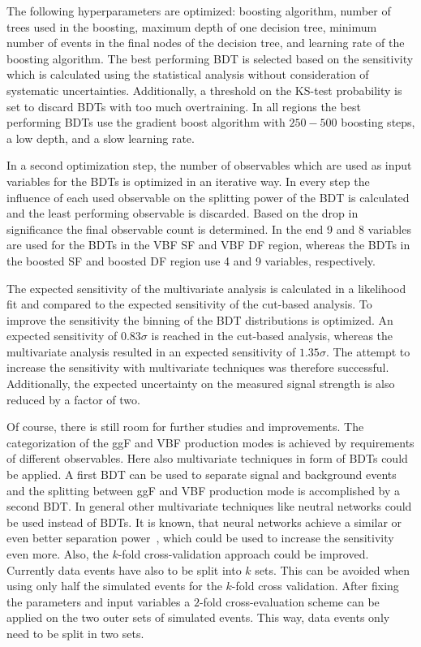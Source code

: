 The following hyperparameters are optimized: boosting algorithm, number of trees used in the boosting, maximum depth of one decision tree,
minimum number of events in the final nodes of the decision tree, and learning rate of the boosting algorithm.
The best performing BDT is selected based on the sensitivity which is calculated using the statistical analysis without consideration of systematic uncertainties.
Additionally, a threshold on the KS-test probability is set to discard BDTs with too much overtraining.
In all regions the best performing BDTs use the gradient boost algorithm with $250 - 500$ boosting steps, a low depth, and a slow learning rate.

In a second optimization step, the number of observables which are used as input variables for the BDTs is optimized in
an iterative way.
In every step the influence of each used observable on the splitting power of the BDT is calculated and the least performing observable is discarded.
Based on the drop in significance the final observable count is determined.
In the end 9 and 8 variables are used for the BDTs in the VBF SF and VBF DF region, whereas the BDTs in the boosted SF
and boosted DF region use 4 and 9 variables, respectively.

The expected sensitivity of the multivariate analysis is calculated in a likelihood fit and compared to the expected sensitivity of
the cut-based analysis.
To improve the sensitivity the binning of the BDT distributions is optimized.
An expected sensitivity of $0.83\sigma$ is reached in the cut-based analysis, whereas the multivariate analysis resulted in
an expected sensitivity of $1.35\sigma$.
The attempt to increase the sensitivity with multivariate techniques was therefore successful.
Additionally, the expected uncertainty on the measured signal strength is also reduced by a factor of two.

Of course, there is still room for further studies and improvements.
The categorization of the ggF and VBF production modes is achieved by requirements of different observables.
Here also multivariate techniques in form of BDTs could be applied.
A first BDT can be used to separate signal and background events and the splitting between ggF and VBF production
mode is accomplished by a second BDT\@.
In general other multivariate techniques like neutral networks could be used instead of BDTs.
It is known, that neural networks achieve a similar or even better separation power~\cite{TMVA}, which could be used to increase
the sensitivity even more.
Also, the $k$-fold cross-validation approach could be improved.
Currently data events have also to be split into $k$ sets.
This can be avoided when using only half the simulated events for the $k$-fold cross validation.
After fixing the parameters and input variables a $2$-fold cross-evaluation scheme can be applied on the two outer sets of simulated events.
This way, data events only need to be split in two sets.
